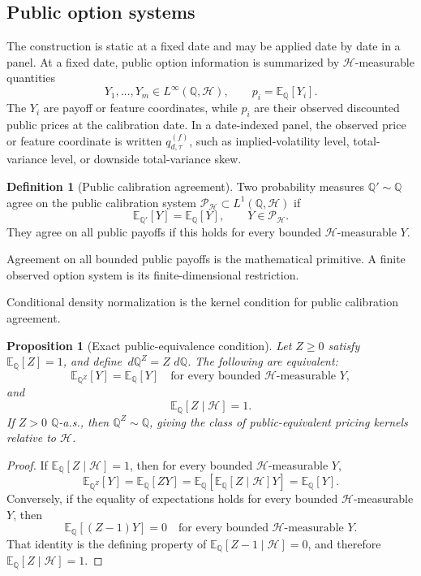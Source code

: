 \documentclass[11pt,a4paper]{amsart}
\theoremstyle{plain}
\newtheorem{proposition}[theorem]{Proposition}
\theoremstyle{definition}
\newtheorem{definition}[theorem]{Definition}
\theoremstyle{remark}
\newcommand{\QQ}{\mathbb{Q}}
\newcommand{\EE}{\mathbb{E}}
\newcommand{\cH}{\mathcal{H}}
\newcommand{\cP}{\mathcal{P}}
\newcommand{\dd}{\,d}
\begin{document}
\subsection{Public option systems}

The construction is static at a fixed date and may be applied date by date in a panel.  At a fixed
date, public option information is summarized by \(\cH\)-measurable quantities
\[
        Y_1,\ldots,Y_m\in L^\infty(\QQ,\cH),
        \qquad
        p_i=\EE_\QQ[Y_i].
\]
The \(Y_i\) are payoff or feature coordinates, while \(p_i\) are their observed discounted public
prices at the calibration date.  In a date-indexed panel, the observed price or feature coordinate is
written \(q_{d,\tau}^{(f)}\), such as implied-volatility level, total-variance level, or downside
total-variance skew.

\begin{definition}[Public calibration agreement]\label{def:public-calibration}
Two probability measures \(\QQ'\sim\QQ\) agree on the public calibration system
\(\cP_{\cH}\subset L^1(\QQ,\cH)\) if
\[
        \EE_{\QQ'}[Y]=\EE_\QQ[Y],
        \qquad
        Y\in\cP_{\cH}.
\]
They agree on all public payoffs if this holds for every bounded \(\cH\)-measurable \(Y\).
\end{definition}

Agreement on all bounded public payoffs is the mathematical primitive.  A finite observed option
system is its finite-dimensional restriction.

Conditional density normalization is the kernel condition for public calibration agreement.

\begin{proposition}[Exact public-equivalence condition]\label{prop:exact-public-equivalence}
Let \(Z\ge0\) satisfy \(\EE_\QQ[Z]=1\), and define
\(\dd\QQ^Z=Z\,\dd\QQ\).  The following are equivalent:
\[
        \EE_{\QQ^Z}[Y]=\EE_\QQ[Y]
        \quad\text{for every bounded }\cH\text{-measurable }Y,
\]
and
\[
        \EE_\QQ[Z\mid\cH]=1.
\]
If \(Z>0\) \(\QQ\)-a.s., then \(\QQ^Z\sim\QQ\), giving the class of public-equivalent pricing
kernels relative to \(\cH\).
\end{proposition}

\begin{proof}
If \(\EE_\QQ[Z\mid\cH]=1\), then for every bounded \(\cH\)-measurable \(Y\),
\[
        \EE_{\QQ^Z}[Y]
        =
        \EE_\QQ[ZY]
        =
        \EE_\QQ[\EE_\QQ[Z\mid\cH]Y]
        =
        \EE_\QQ[Y].
\]
Conversely, if the equality of expectations holds for every bounded \(\cH\)-measurable \(Y\), then
\[
        \EE_\QQ[(Z-1)Y]=0
        \quad\text{for every bounded }\cH\text{-measurable }Y.
\]
That identity is the defining property of \(\EE_\QQ[Z-1\mid\cH]=0\), and therefore
\(\EE_\QQ[Z\mid\cH]=1\).
\end{proof}
\end{document}
